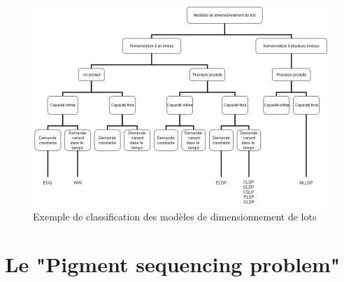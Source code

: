 \documentclass[12pt,a4paper]{article}
\begin{document}
	\begin{center}
		\begin{figure}[!h]
			\includegraphics[scale=.5]{img/classification_dimensionnement.png}
			\caption{Exemple de classification des modèles de dimensionnement de lots}
		\end{figure}
	\end{center}

	\newpage
	
	\section{Le "Pigment sequencing problem"}
	
\end{document}
